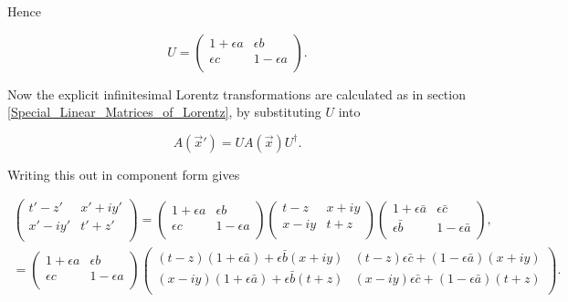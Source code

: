 \noindent Hence 

\begin{equation}\label{Infinitesimal_Infinitesimal_Lorentz_Transform_Matrix_U_Final}
U =
\left(
\begin{array}{cc}
1 + \epsilon a & \epsilon b \\
\epsilon c & 1 - \epsilon a \\
\end{array}
\right).
\end{equation}

Now the explicit infinitesimal Lorentz transformations are calculated as in section \ref{Special_Linear_Matrices_of_Lorentz}, by substituting $U$ into

\begin{equation*}
A(\vec{x}') = U A(\vec{x}) U^{\dagger}.
\end{equation*}

\noindent Writing this out in component form gives

\begin{align*}
\left(
\begin{array}{cc}
t'-z' & x' + iy' \\
x' - iy' & t'+z' \\
\end{array}
\right)
=
\left(
\begin{array}{cc}
1 + \epsilon a & \epsilon b \\
\epsilon c & 1 - \epsilon a \\
\end{array}
\right)
\left(
\begin{array}{cc}
t-z & x + iy \\
x - iy & t+z \\
\end{array}
\right)
\left(
\begin{array}{cc}
1 + \epsilon  \bar{a} & \epsilon \bar{c} \\
\epsilon \bar{b} & 1 - \epsilon \bar{a} \\
\end{array}
\right), \\
=
\left(
\begin{array}{cc}
1 + \epsilon a & \epsilon b \\
\epsilon c & 1 - \epsilon a \\
\end{array}
\right)
\left(
\begin{array}{cc}
(t-z)(1 + \epsilon \bar{a})+\epsilon \bar{b}(x + iy) & (t-z)\epsilon \bar{c}+ (1 - \epsilon \bar{a})(x + iy) \\
(x - iy)(1 + \epsilon \bar{a}) +\epsilon \bar{b} (t+z) & (x - iy)\epsilon \bar{c}+(1 - \epsilon \bar{a})(t+z) \\
\end{array}
\right).
\end{align*}

